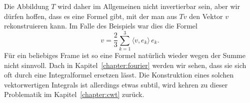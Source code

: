 Die Abbildung $T$ wird daher im Allgemeinen nicht invertierbar sein, aber
wir dürfen hoffen, dass es eine Formel gibt, mit der man aus $Tv$ den 
Vektor $v$ rekonstruieren kann.
Im Falle des Beispiels war dies die Formel
\[
v = \frac23 \sum_{k=1}^3 \langle v,e_k\rangle \, e_k.
\]
Für ein beliebiges Frame ist so eine Formel natürlich wieder wegen
der Summe nicht sinnvoll.
Dach in Kapitel~\ref{chapter:fourier} werden wir sehen, dass sie sich
oft durch eine Integralformel ersetzen lässt.
Die Konstruktion eines solchen vektorwertigen Integrals ist allerdings
etwas subtil, wird kehren zu dieser Problematik im Kapitel~\ref{chapter:cwt}
zurück.


